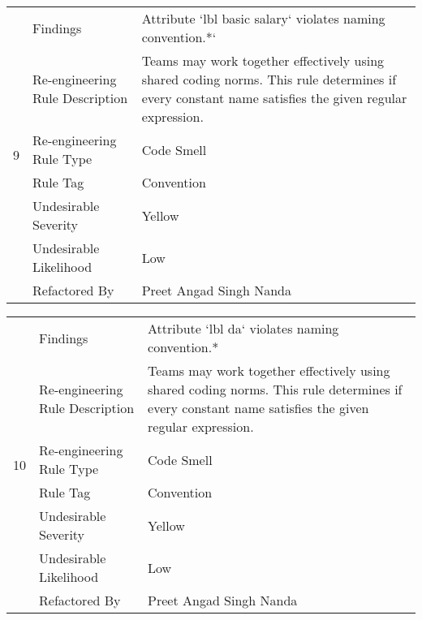 \documentclass[12pt,english]{article}
\begin{document}
\begin{table}[!ht]
    \begin{tabularx}{\textwidth}{|c|l|X|}
    \hline
        \multirow{7}{*}{9} & Findings & Attribute ‘lbl basic salary‘ violates naming convention.*‘ \\ \cline{2-3}
        & Re-engineering Rule Description & Teams may work together effectively using shared coding norms. This rule determines if every constant name satisfies the given regular expression.\\ \cline{2-3}
        & Re-engineering Rule Type & Code Smell \\ \cline{2-3}
        & Rule Tag & Convention \\ \cline{2-3}
        & Undesirable Severity & Yellow \\ \cline{2-3}
        & Undesirable Likelihood & Low \\ \cline{2-3}
        & Refactored By & Preet Angad Singh Nanda \\ \hline
    \end{tabularx}
\end{table}

\begin{table}[!ht]
    \begin{tabularx}{\textwidth}{|c|l|X|}
    \hline
        \multirow{7}{*}{10} & Findings & Attribute ‘lbl da‘ violates naming convention.* \\ \cline{2-3}
        & Re-engineering Rule Description & Teams may work together effectively using shared coding norms. This rule determines if every constant name satisfies the given regular expression. \\ \cline{2-3}
        & Re-engineering Rule Type & Code Smell \\ \cline{2-3}
        & Rule Tag & Convention \\ \cline{2-3}
        & Undesirable Severity & Yellow \\ \cline{2-3}
        & Undesirable Likelihood & Low \\ \cline{2-3}
        & Refactored By & Preet Angad Singh Nanda \\ \hline
    \end{tabularx}
\end{table}
\end{document}
